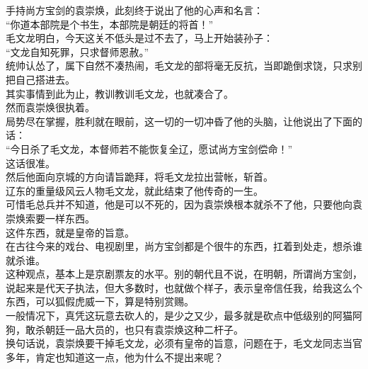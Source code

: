 \begin{multicols}{\theparacolNo}
手持尚方宝剑的袁崇焕，此刻终于说出了他的心声和名言：\\

“你道本部院是个书生，本部院是朝廷的将首！”\\

毛文龙明白，今天这关不低头是过不去了，马上开始装孙子：\\

“文龙自知死罪，只求督师恩赦。”\\

统帅认怂了，属下自然不凑热闹，毛文龙的部将毫无反抗，当即跪倒求饶，只求别把自己搭进去。\\

其实事情到此为止，教训教训毛文龙，也就凑合了。\\

然而袁崇焕很执着。\\

局势尽在掌握，胜利就在眼前，这一切的一切冲昏了他的头脑，让他说出了下面的话：\\

“今日杀了毛文龙，本督师若不能恢复全辽，愿试尚方宝剑偿命！”\\

这话很准。\\

然后他面向京城的方向请旨跪拜，将毛文龙拉出营帐，斩首。\\

辽东的重量级风云人物毛文龙，就此结束了他传奇的一生。\\

可惜毛总兵并不知道，他是可以不死的，因为袁崇焕根本就杀不了他，只要他向袁崇焕索要一样东西。\\

这件东西，就是皇帝的旨意。\\

在古往今来的戏台、电视剧里，尚方宝剑都是个很牛的东西，扛着到处走，想杀谁就杀谁。\\

这种观点，基本上是京剧票友的水平。别的朝代且不说，在明朝，所谓尚方宝剑，说起来是代天子执法，但大多数时，也就做个样子，表示皇帝信任我，给我这么个东西，可以狐假虎威一下，算是特别赏赐。\\

一般情况下，真凭这玩意去砍人的，是少之又少，最多就是砍点中低级别的阿猫阿狗，敢杀朝廷一品大员的，也只有袁崇焕这种二杆子。\\

换句话说，袁崇焕要干掉毛文龙，必须有皇帝的旨意，问题在于，毛文龙同志当官多年，肯定也知道这一点，他为什么不提出来呢？\\


\end{multicols}
